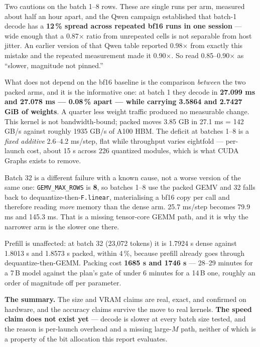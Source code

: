 \documentclass[11pt]{article}
\newcommand{\x}{\texorpdfstring{$\times$}{x}}
\newcommand{\pct}{\,\%}
\newcommand{\code}[1]{\texttt{#1}}
\newenvironment{aside}%
{\par\needspace{4\baselineskip}\vspace{0.8ex}%
\begin{lrbox}{\asidebox}\begin{minipage}{\dimexpr\textwidth-18pt\relax}\small}%
{\end{minipage}\end{lrbox}%
\noindent\setlength{\fboxsep}{9pt}\colorbox{warnbg}{\usebox{\asidebox}}%
\vspace{0.6ex}\par}
\begin{document}
Two cautions on the batch 1--8 rows. These are single runs per arm, measured about half an hour
apart, and the Qwen campaign established that batch-1 decode has a \textbf{12\pct{} spread across
repeated bf16 runs in one session} --- wide enough that a 0.87\x{} ratio from unrepeated cells is
not separable from host jitter. An earlier version of that Qwen table reported 0.98\x{} from
exactly this mistake and the repeated measurement made it 0.90\x. So read 0.85--0.90\x{} as
``slower, magnitude not pinned.''

What does not depend on the bf16 baseline is the comparison \emph{between} the two packed arms,
and it is the informative one: at batch 1 they decode in \textbf{27.099 ms and 27.078 ms ---
0.08\pct{} apart --- while carrying 3.5864 and 2.7427 GiB of weights}. A quarter less weight
traffic produced no measurable change. This kernel is not bandwidth-bound; packed moves 3.85 GB
in 27.1 ms = 142 GB/s against roughly 1935 GB/s of A100 HBM. The deficit at batches 1--8 is a
\emph{fixed additive} 2.6--4.2 ms/step, flat while throughput varies eightfold --- per-launch
cost, about 15 \textmu s across 226 quantized modules, which is what CUDA Graphs exists to
remove.

Batch 32 is a different failure with a known cause, not a worse version of the same one:
\code{GEMV\_MAX\_ROWS} is \textbf{8}, so batches 1--8 use the packed GEMV and 32 falls back to
dequantize-then-\code{F.linear}, materialising a bf16 copy per call and therefore reading
\emph{more} memory than the dense arm. 25.7 ms/step becomes 79.9 ms and 145.3 ms. That is a
missing tensor-core GEMM path, and it is why the narrower arm is the slower one there.

Prefill is unaffected: at batch 32 (23{,}072 tokens) it is 1.7924 s dense against 1.8013 s and
1.8573 s packed, within 4\pct, because prefill already goes through dequantize-then-GEMM. Packing
cost \textbf{1685 s and 1746 s} --- 28--29 minutes for a 7\,B model against the plan's gate of
under 6 minutes for a 14\,B one, roughly an order of magnitude off per parameter.

\begin{aside}
\textbf{The summary.} The size and VRAM claims are real, exact, and confirmed on hardware, and
the accuracy claims survive the move to real kernels. \textbf{The speed claim does not exist
yet} --- decode is slower at every batch size tested, and the reason is per-launch overhead and a
missing large-$M$ path, neither of which is a property of the bit allocation this report
evaluates.
\end{aside}
\end{document}
